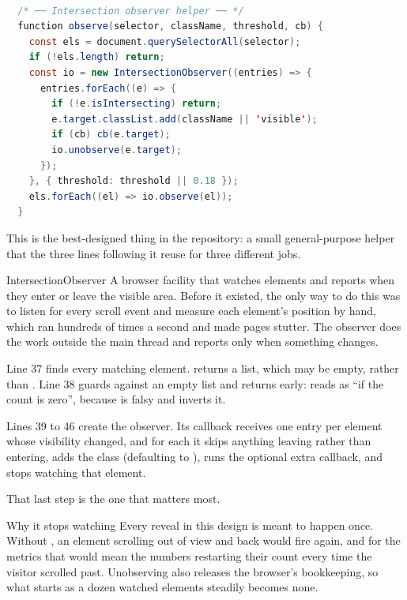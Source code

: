 \begin{lstlisting}[language=Java,firstnumber=34,caption={\file{js/main.js}, lines 34--48}]

  /* ── Intersection observer helper ── */
  function observe(selector, className, threshold, cb) {
    const els = document.querySelectorAll(selector);
    if (!els.length) return;
    const io = new IntersectionObserver((entries) => {
      entries.forEach((e) => {
        if (!e.isIntersecting) return;
        e.target.classList.add(className || 'visible');
        if (cb) cb(e.target);
        io.unobserve(e.target);
      });
    }, { threshold: threshold || 0.18 });
    els.forEach((el) => io.observe(el));
  }
\end{lstlisting}

This is the best-designed thing in the repository: a small general-purpose helper
that the three lines following it reuse for three different jobs.

\begin{jargon}{IntersectionObserver}
A browser facility that watches elements and reports when they enter or leave the
visible area. Before it existed, the only way to do this was to listen for every
scroll event and measure each element's position by hand, which ran hundreds of
times a second and made pages stutter. The observer does the work outside the main
thread and reports only when something changes.
\end{jargon}

Line 37 finds every matching element.  returns a list, which
may be empty, rather than . Line 38 guards against an empty list and
returns early:  reads as ``if the count is zero'', because
 is falsy and \code{!} inverts it.

Lines 39 to 46 create the observer. Its callback receives one entry per element
whose visibility changed, and for each it skips anything leaving rather than
entering, adds the class (defaulting to ), runs the optional extra
callback, and stops watching that element.

That last step is the one that matters most.

\begin{keyidea}{Why it stops watching}
Every reveal in this design is meant to happen once. Without , an
element scrolling out of view and back would fire again, and for the metrics that
would mean the numbers restarting their count every time the visitor scrolled past.
Unobserving also releases the browser's bookkeeping, so what starts as a dozen
watched elements steadily becomes none.
\end{keyidea}


